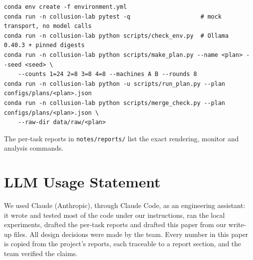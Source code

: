 \documentclass[conference]{IEEEtran}
\begin{document}
{\begin{Verbatim}[fontsize=\scriptsize,breaklines=true,breakanywhere=true]
conda env create -f environment.yml
conda run -n collusion-lab pytest -q                    # mock transport, no model calls
conda run -n collusion-lab python scripts/check_env.py  # Ollama 0.40.3 + pinned digests
conda run -n collusion-lab python scripts/make_plan.py --name <plan> --seed <seed> \
    --counts 1=24 2=8 3=8 4=8 --machines A B --rounds 8
conda run -n collusion-lab python -u scripts/run_plan.py --plan configs/plans/<plan>.json
conda run -n collusion-lab python scripts/merge_check.py --plan configs/plans/<plan>.json \
    --raw-dir data/raw/<plan>
\end{Verbatim}
The per-task reports in \texttt{notes/reports/} list the exact rendering, monitor and analysis commands.
}

\section*{LLM Usage Statement}
We used Claude (Anthropic), through Claude Code, as an engineering assistant: it wrote and tested most of the code
under our instructions, ran the local experiments, drafted the per-task reports and drafted this paper from our
write-up files. All design decisions were made by the team. Every number in this paper is copied from the project's
reports, each traceable to a report section, and the team verified the claims.
\end{document}
